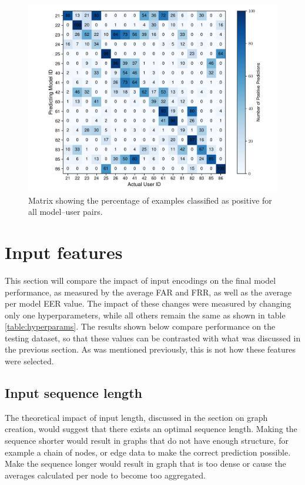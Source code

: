 \begin{figure}[H]
	\centering
	\includegraphics[width=\textwidth]{images/all_models_5_len40.pdf} %
	\caption{Matrix showing the percentage of examples classified as positive for all model--user pairs.}
	\label{fig:all_models_5_len40}
\end{figure}



\section{Input features}
This section will compare the impact of input encodings on the final model performance, as measured by the average FAR and FRR, as well as the average per model EER value. The impact of these changes were measured by changing only one hyperparameters, while all others remain the same as shown in table \ref{table:hyperparams}. The results shown below compare performance on the testing dataset, so that these values can be contrasted with what was discussed in the previous section. As was mentioned previously, this is not how these features were selected.

\subsection{Input sequence length}
The theoretical impact of input length, discussed in the section on graph creation, would suggest that there exists an optimal sequence length. Making the sequence shorter would result in graphs that do not have enough structure, for example a chain of nodes, or edge data to make the correct prediction possible. Make the sequence longer would result in graph that is too dense or cause the averages calculated per node to become too aggregated.\\


